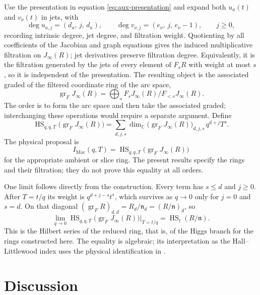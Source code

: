\documentclass[10pt,reqno]{amsart}
\numberwithin{equation}{section}
\theoremstyle{plain}
\theoremstyle{definition}
\DeclareMathOperator{\gr}{gr}
\DeclareMathOperator{\HS}{HS}
\newcommand{\Mac}{\mathrm{Mac}}
\begin{document}
Use the presentation in equation \eqref{eq:aux-presentation} and expand both $u_a(t)$ and $v_\nu(t)$ in jets, with
\begin{equation*}
	\deg u_{a,j}=(d_a,\,j,\,d_a),\qquad \deg v_{\nu,j}=(e_\nu,\,j,\,e_\nu-1),\qquad j\ge0,
\end{equation*}
recording intrinsic degree, jet degree, and filtration weight. Quotienting by all coefficients of the Jacobian and graph equations gives the induced multiplicative filtration on $J_\infty(R)$; jet derivatives preserve filtration degree. Equivalently, it is the filtration generated by the jets of every element of $F_sR$ with weight at most $s$, so it is independent of the presentation. The resulting object is the associated graded of the filtered coordinate ring of the arc space,
\begin{equation*}
	\gr_FJ_\infty(R)=\bigoplus_sF_sJ_\infty(R)/F_{<s}J_\infty(R).
\end{equation*}
The order is to form the arc space and then take the associated graded; interchanging these operations would require a separate argument. Define
\begin{equation*}
	\HS_{q,q,T}\big(\gr_FJ_\infty(R)\big)=\sum_{d,j,s}\dim_\mathbb{C}\big(\gr_FJ_\infty(R)\big)_{d,j,s}\,q^{d+j}T^s .
\end{equation*}
The physical proposal \cite{KLSnonpoint,Kang:2026ney} is
\begin{equation}\label{eq:indexproposal}
	I_{\Mac}(q,T)=\HS_{q,q,T}\big(\gr_FJ_\infty(R)\big)
\end{equation}
for the appropriate ambient or slice ring. The present results specify the rings and their filtration; they do not prove this equality at all orders.

One limit follows directly from the construction. Every term has $s\le d$ and $j\ge0$. After $T=t/q$ its weight is $q^{d+j-s}t^s$, which survives as $q\to0$ only for $j=0$ and $s=d$. On that diagonal $(\gr_FR)_{d,d}=R_d/\mathfrak{n}_d=(R/\mathfrak{n})_d$, so
\begin{equation}\label{eq:HL}
	\lim_{q\to0}\HS_{q,q,T}\big(\gr_FJ_\infty(R)\big)\Big|_{T=t/q}=\HS_t(R/\mathfrak{n}).
\end{equation}
This is the Hilbert series of the reduced ring, that is, of the Higgs branch for the rings constructed here. The equality is algebraic; its interpretation as the Hall--Littlewood index uses the physical identification in \cite{Kang:2022zsl,Kang:2026ney}.


\section{Discussion}\label{sec:discussion}
\end{document}
